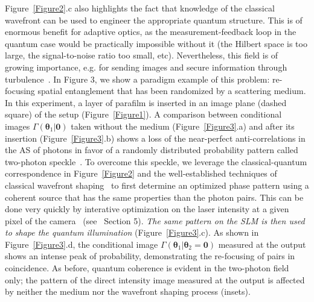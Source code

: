 \documentclass[%
 reprint,
 amsmath,amssymb,
 aps
]{revtex4-1}
\begin{document}
Figure~\ref{Figure2}.c also highlights the fact that knowledge of the classical wavefront can be used to engineer the appropriate quantum structure. This is of enormous benefit for adaptive optics, as the measurement-feedback loop in the quantum case would be practically impossible without it (the Hilbert space is too large, the signal-to-noise ratio too small, etc). Nevertheless, this field is of growing importance, e.g. for sending images and secure information through turbulence~\cite{sit_high-dimensional_2017,bouchard_experimental_2018}. In Figure 3, we show a paradigm example of this problem: re-focusing spatial entanglement that has been randomized by a scattering medium. In this experiment, a layer of parafilm is inserted in an image plane (dashed square) of the setup (Figure~\ref{Figure1}). A comparison between conditional images $\Gamma(\boldsymbol{\theta}_1|\boldsymbol{0})$ taken without the medium (Figure~\ref{Figure3}.a) and after its insertion (Figure~\ref{Figure3}.b) shows a loss of the near-perfect anti-correlations in the AS of photons in favor of a randomly distributed probability pattern called two-photon speckle~\cite{peeters_observation_2010}. To overcome this speckle, we leverage the classical-quantum correspondence in Figure~\ref{Figure2} and the well-established techniques of classical wavefront shaping~\cite{mosk_controlling_2012} to first determine an optimized phase pattern using a coherent source that has the same properties than the photon pairs. This can be done very quickly by interative optimization on the laser intensity at a given pixel of the camera~\cite{vellekoop_focusing_2007} (see~\cite{supmat} Section 5). \textit{The same pattern on the SLM is then used to shape the quantum illumination} (Figure~\ref{Figure3}.c). As shown in Figure~\ref{Figure3}.d, the conditional image $\Gamma(\boldsymbol{\theta}_1|\boldsymbol{\theta}_2=\boldsymbol{0})$ measured at the output shows an intense peak of probability,  demonstrating the re-focusing of pairs in coincidence. As before, quantum coherence is evident in the two-photon field only; the pattern of the direct intensity image measured at the output is affected by neither the medium nor the wavefront shaping process (insets). 
\end{document}

